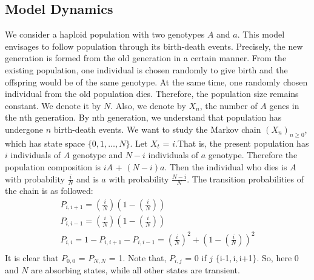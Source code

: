\subsection{Model Dynamics}
We consider a haploid population with two genotypes $A$ and $a$. This model envisages to follow population through its birth-death events. Precisely, the new generation is formed from the old generation in a certain manner.
\newline
From the existing population, one individual is chosen randomly to give birth and the offspring would be of the same genotype. At the same time, one randomly chosen individual from the old population dies. Therefore, the population size remains constant. We denote it by $N$. Also, we denote by $X_{n}$, the number of $A$ genes in the nth generation. By nth generation, we understand that population has undergone $n$ birth-death events. We want to study the Markov chain $(X_{n})_{n\geq0}$, which has state space $\{0, 1, \ldots, N\}$.
\newline
Let $X_{t}$ = $i$.That is, the present population has $i$ individuals of $A$ genotype and $N-i$ individuals of $a$ genotype. Therefore the population composition is $iA$ + $(N-i)a$. Then the individual who dies is $A$ with probability $\frac{i}{N}$ and is $a$ with probability $\frac{N-i}{N}$. The transition probabilities of the chain is as followed:
\newline
\begin{equation*}
\begin{split}
P_{i,i+1}  = \left(\frac{i}{N}\right)\left(1-\left(\frac{i}{N}\right)\right) \\
P_{i,i-1}  = \left(\frac{i}{N}\right)\left(1-\left(\frac{i}{N}\right)\right) \\
P_{i,i}  = 1 - P_{i,i+1} - P_{i,i-1} = \left(\frac{i}{N}\right)^{2} + \left(1-\left(\frac{i}{N}\right)\right)^{2} \\
\end{split}
\end{equation*}
It is clear that $P_{0,0}$ = $P_{N,N}$ = 1. Note that, $P_{i,j}$ = 0 if $j$ \notin $\{$i-1$, $i$ , $i+1$\}$.
\newline
So, here $0$ and $N$ are absorbing states, while all other states are transient.

